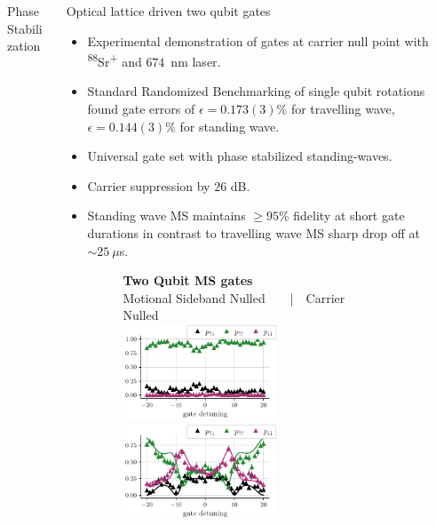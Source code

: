 \documentclass[final]{beamer}
\begin{document}
\begin{frame}{}
\begin{center}
\begin{columns}[t]
\begin{column}{0.49\textwidth}
\begin{alertblock}{Phase Stabilization}
    \end{alertblock}

  \end{column}
  \begin{column}{0.49\textwidth}
    \begin{alertblock}{Optical lattice driven two qubit gates}
      \begin{minipage}{0.60\linewidth}
      \begin{itemize}
        \item Experimental demonstration of gates at carrier null
          point with \textsuperscript{88}Sr\textsuperscript{+} and
          $674$~nm laser.
        \item Standard Randomized Benchmarking of single qubit
          rotations found gate errors of $\epsilon = 0.173(3)\%$ for
          travelling wave, $\epsilon = 0.144(3)\%$ for standing
          wave.
        \item Universal gate set with phase stabilized standing-waves.
        \item Carrier suppression by $26$ dB.
        \item Standing wave MS maintains $\geq 95\%$ fidelity at short gate durations in contrast to travelling wave MS sharp drop off at $\sim 25~\mu$s.\\
      \begin{figure}
        \center
        \textbf{\large Two Qubit MS gates\normalsize} \\
        \hspace*{-2.5em}Motional Sideband Nulled~~~~|~~\quad\quad\quad Carrier Nulled~~~~~~ \\
        \hspace*{-1.3em}\includegraphics[width=0.52\textwidth]{./figs/detuning_scan_100us_carrier_coupling.pdf}
        \hspace*{-1em}\includegraphics[width=0.52\textwidth]{./figs/detuning_scan_100us_gate.pdf}

\end{figure}
\end{itemize}
\end{minipage}
\end{alertblock}
\end{column}
\end{columns}
\end{center}
\end{frame}
\end{document}
